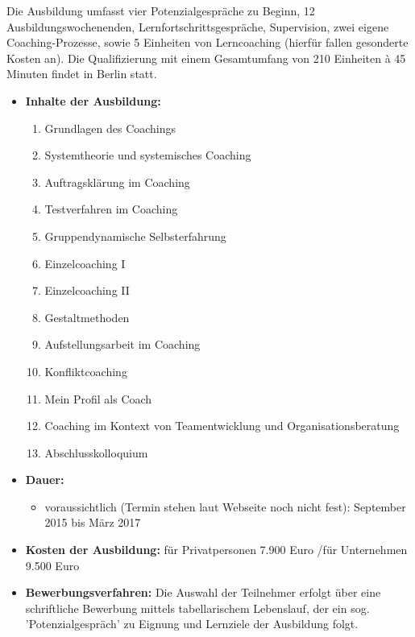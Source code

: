 \documentclass[11pt,a4paper]{article}
\begin{document}
Die Ausbildung umfasst vier Potenzialgespräche zu Beginn, 12 Ausbildungswochenenden, Lernfortschrittsgespräche, Supervision, zwei eigene Coaching-Prozesse, sowie 5 Einheiten von Lerncoaching (hierfür fallen gesonderte Kosten an). Die Qualifizierung mit einem Gesamtumfang von 210 Einheiten \`{a} 45 Minuten findet in Berlin statt.
	\begin{itemize}
	\item \textbf{Inhalte der Ausbildung:}
		
		\begin{enumerate}
		\item Grundlagen des Coachings
		\item Systemtheorie und systemisches Coaching
		\item Auftragsklärung im Coaching
		\item Testverfahren im Coaching
		\item Gruppendynamische Selbsterfahrung
		\item Einzelcoaching I
		\item Einzelcoaching II
		\item Gestaltmethoden
		\item Aufstellungsarbeit im Coaching
		\item Konfliktcoaching
		\item Mein Profil als Coach
		\item Coaching im Kontext von Teamentwicklung und Organisationsberatung
		\item Abschlusskolloquium
		\end{enumerate}
	
	\item \textbf{Dauer:}

		\begin{itemize} 
		\item voraussichtlich (Termin stehen laut Webseite noch nicht fest): September 2015 bis März 2017
		\end{itemize}

	\item \textbf{Kosten der Ausbildung:} für Privatpersonen 7.900 Euro /für Unternehmen 9.500 Euro

	\item \textbf{Bewerbungsverfahren:} Die Auswahl der Teilnehmer erfolgt über eine schriftliche Bewerbung mittels tabellarischem Lebenslauf, der ein sog. 'Potenzialgespräch' zu Eignung und Lernziele der Ausbildung folgt.
	\end{itemize}


\end{document}
